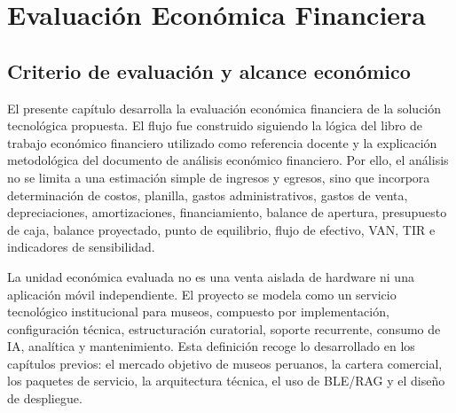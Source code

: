 \chapter{Evaluación Económica Financiera}

\begingroup
\sloppy
\setlength{\emergencystretch}{3em}


\newcommand{\mqiWhite}[1]{\textcolor{white}{\textbf{#1}}}
\newcommand{\mqiTableSetup}{\arrayrulecolor{EvalGrid}\renewcommand{\arraystretch}{1.12}\setlength{\tabcolsep}{3.5pt}}
\newcommand{\mqiTitle}[2]{\rowcolor{EvalBlueDark}\multicolumn{#1}{|c|}{\mqiWhite{#2}}\\ \hline}
\newcommand{\mqiHead}{\rowcolor{EvalBlue}}
\newcommand{\mqiA}{\rowcolor{EvalLight}}
\newcommand{\mqiB}{\rowcolor{EvalLighter}}
\newcommand{\mqiT}{\rowcolor{EvalTotal}}

\section{Criterio de evaluación y alcance económico}

El presente capítulo desarrolla la evaluación económica financiera de la solución tecnológica propuesta. El flujo fue construido siguiendo la lógica del libro de trabajo económico financiero utilizado como referencia docente y la explicación metodológica del documento de análisis económico financiero. Por ello, el análisis no se limita a una estimación simple de ingresos y egresos, sino que incorpora determinación de costos, planilla, gastos administrativos, gastos de venta, depreciaciones, amortizaciones, financiamiento, balance de apertura, presupuesto de caja, balance proyectado, punto de equilibrio, flujo de efectivo, VAN, TIR e indicadores de sensibilidad.

La unidad económica evaluada no es una venta aislada de hardware ni una aplicación móvil independiente. El proyecto se modela como un servicio tecnológico institucional para museos, compuesto por implementación, configuración técnica, estructuración curatorial, soporte recurrente, consumo de IA, analítica y mantenimiento. Esta definición recoge lo desarrollado en los capítulos previos: el mercado objetivo de museos peruanos, la cartera comercial, los paquetes de servicio, la arquitectura técnica, el uso de BLE/RAG y el diseño de despliegue.

